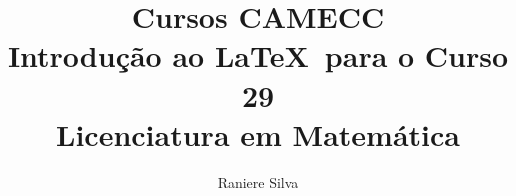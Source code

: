 \documentclass[12pt,a4paper,openright,twoside]{book}
\begin{document}
\title{Cursos CAMECC \\ Introdu\c{c}\~{a}o ao \LaTeX \ para o Curso 29 \\ Licenciatura em Matem\'{a}tica}
\author{Raniere Silva}
\maketitle

\frontmatter 



 

\tableofcontents 
\listoftables

\mainmatter 





\appendix




\backmatter 

\nocite{Lamport:1994:LaTeX, Graetzer:2007:MoreMath, Santos:2009:IntroducaoLaTeX, Souto:CursoLaTeX}



\printindex
\end{document}
